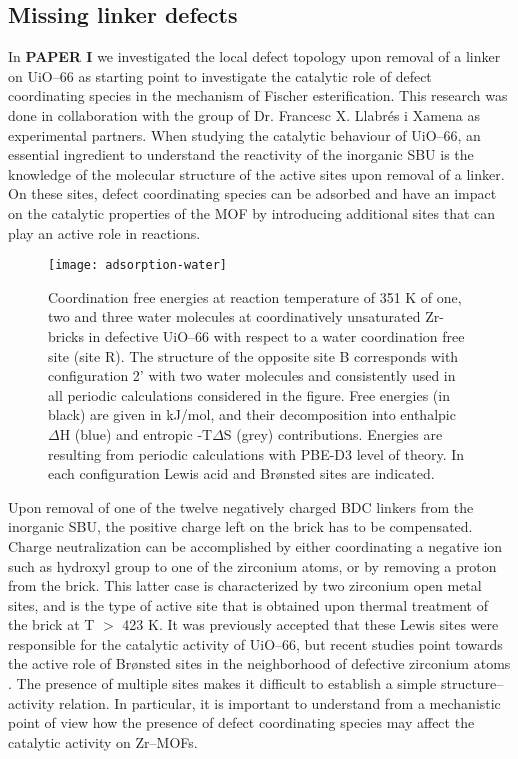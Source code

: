 \subsection*{Missing linker defects}
In \textbf{PAPER I} we investigated the local defect topology upon removal of a linker on UiO--66 as starting point to investigate the catalytic role of defect coordinating species in the mechanism of Fischer esterification. This research was done in collaboration with the group of Dr. Francesc X. Llabr\'es i Xamena as experimental partners. When studying the catalytic behaviour of UiO--66, an essential ingredient to understand the reactivity of the inorganic SBU is the knowledge of the molecular structure of the active sites upon removal of a linker. On these sites, defect coordinating species can be adsorbed and have an impact on the catalytic properties of the MOF by introducing additional sites that can play an active role in reactions. 
\begin{figure}[!htbp]
	\centering
	\texttt{[image: adsorption-water]}
	\caption{Coordination free energies at reaction temperature of 351 K of one, two and three water molecules at coordinatively unsaturated Zr-bricks in defective UiO--66 with respect to a water coordination free site (site R). The structure of the opposite site B corresponds with configuration 2’ with two water molecules and consistently used in all periodic calculations considered in the figure. Free energies (in black) are given in kJ/mol, and their decomposition into enthalpic $\Delta$H (blue) and entropic -T$\Delta$S (grey) contributions. Energies are resulting from periodic calculations with PBE-D3 level of theory. In each configuration Lewis acid and Brønsted sites are indicated.}
	\label{fig:adsorption-water}
\end{figure}
Upon removal of one of the twelve negatively charged BDC linkers from the inorganic  SBU, the positive charge left on the brick has to be compensated. Charge neutralization can be accomplished by either coordinating a negative ion such as hydroxyl group to one of the zirconium atoms, or by removing a proton from the brick. This latter case is characterized by two zirconium open metal sites, and is the type of active site that is obtained upon thermal treatment of the brick at T $>$ 423 K. It was previously accepted that these Lewis sites were responsible for the catalytic activity of UiO--66, but recent studies point towards the active role of Br\o{}nsted sites in the neighborhood of defective zirconium atoms \cite{canivet2014water, oien2014detailed, canivet2016origin, ling2016dynamic, liu2016probing, klet2016evaluation, vandichel2016water, ghosh2014water}. The presence of multiple sites makes it difficult to establish a simple structure--activity relation. In particular, it is important to understand from a mechanistic point of view how the presence of defect coordinating species may affect the catalytic activity on Zr--MOFs. 
